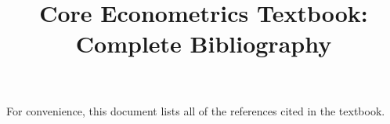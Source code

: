 \documentclass[nohyper]{external/tufte-handout}
\title{Core Econometrics Textbook: Complete Bibliography}
\begin{document}
\maketitle

For convenience, this document lists all of the references cited in
the textbook.

\nocite{*}


\end{document}

